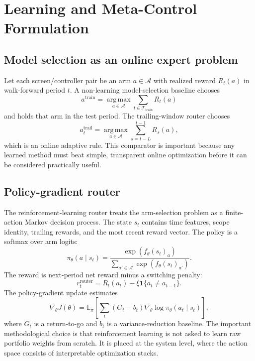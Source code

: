 \documentclass[journal,10pt]{IEEEtran}
\newcommand{\E}{\mathbb{E}}
\newcommand{\argmax}{\operatorname*{arg\,max}}
\begin{document}
\section{Learning and Meta-Control Formulation}
\subsection{Model selection as an online expert problem}
Let each screen/controller pair be an arm $a\in\mathcal{A}$ with realized reward $R_t(a)$ in walk-forward period $t$. A non-learning model-selection baseline chooses
\begin{equation}
a^{\text{train}}=\argmax_{a\in\mathcal{A}}\sum_{t\in\mathcal{T}_{\text{train}}}R_t(a)
\end{equation}
and holds that arm in the test period. The trailing-window router chooses
\begin{equation}
a_t^{\text{trail}}=\argmax_{a\in\mathcal{A}}\sum_{s=t-L}^{t-1}R_s(a),
\end{equation}
which is an online adaptive rule. This comparator is important because any learned method must beat simple, transparent online optimization before it can be considered practically useful.

\subsection{Policy-gradient router}
The reinforcement-learning router treats the arm-selection problem as a finite-action Markov decision process. The state $s_t$ contains time features, scope identity, trailing rewards, and the most recent reward vector. The policy is a softmax over arm logits:
\begin{equation}
\pi_\theta(a\mid s_t)=\frac{\exp(f_\theta(s_t)_a)}{\sum_{a'\in\mathcal{A}}\exp(f_\theta(s_t)_{a'})}.
\end{equation}
The reward is next-period net reward minus a switching penalty:
\begin{equation}
r_t^{\text{router}}=R_t(a_t)-\xi\mathbf{1}\{a_t\ne a_{t-1}\}.
\end{equation}
The policy-gradient update estimates
\begin{equation}
\nabla_\theta J(\theta)=\E_\pi\left[\sum_t (G_t-b_t)\nabla_\theta\log\pi_\theta(a_t\mid s_t)\right],
\label{eq:policy_gradient}
\end{equation}
where $G_t$ is a return-to-go and $b_t$ is a variance-reduction baseline. The important methodological choice is that reinforcement learning is not asked to learn raw portfolio weights from scratch. It is placed at the system level, where the action space consists of interpretable optimization stacks.
\end{document}
